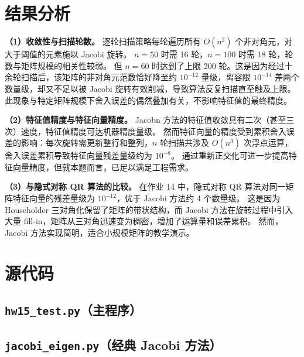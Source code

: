 \documentclass[10pt, a4paper]{article}
\begin{document}
\section{结果分析}

\textbf{（1）收敛性与扫描轮数。}
逐轮扫描策略每轮遍历所有 $O(n^2)$ 个非对角元，对大于阈值的元素施以 Jacobi 旋转。
$n = 50$ 时需 16 轮，$n = 100$ 时需 18 轮，轮数与矩阵规模的相关性较弱。
但 $n = 60$ 时达到了上限 200 轮。这是因为经过十余轮扫描后，该矩阵的非对角元范数恰好降至约 $10^{-12}$ 量级，离容限 $10^{-14}$ 差两个数量级，却又不足以被 Jacobi 旋转有效削减，导致算法反复扫描直至触及上限。此现象与特定矩阵规模下舍入误差的偶然叠加有关，不影响特征值的最终精度。

\textbf{（2）特征值精度与特征向量精度。}
Jacobn 方法的特征值收敛具有二次（甚至三次）速度，特征值精度可达机器精度量级。
然而特征向量的精度受到累积舍入误差的影响：每次旋转需更新整行和整列，$n$ 轮扫描共涉及 $O(n^3)$ 次浮点运算，舍入误差累积导致特征向量残差量级约为 $10^{-8}$。
通过重新正交化可进一步提高特征向量精度，但就本题而言，已足以满足工程需求。

\textbf{（3）与隐式对称 QR 算法的比较。}
在作业 14 中，隐式对称 QR 算法对同一矩阵特征向量的残差量级为 $10^{-12}$，优于 Jacobi 方法约 4 个数量级。
这是因为 Householder 三对角化保留了矩阵的带状结构，而 Jacobi 方法在旋转过程中引入大量 fill-in，矩阵从三对角迅速变为稠密，增加了运算量和误差累积。
然而，Jacobi 方法实现简明，适合小规模矩阵的教学演示。

\appendix
\section{源代码}

\subsection{\texttt{hw15\_test.py}（主程序）}


\subsection{\texttt{jacobi\_eigen.py}（经典 Jacobi 方法）}

\end{document}
